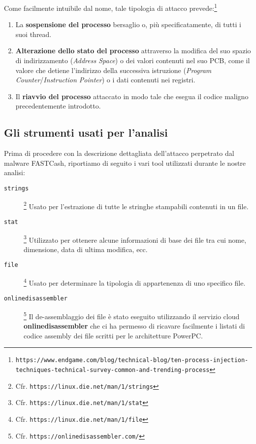 \documentclass[10pt,a4paper, titlepage]{report}
\begin{document}
Come facilmente intuibile dal nome, tale tipologia di attacco prevede:\footnote{\texttt{https://www.endgame.com/blog/technical-blog/ten-process-injection-techniques-technical-survey-common-and-trending-process}}
\begin{enumerate}
\item La \textbf{sospensione del processo} bersaglio o, più specificatamente, di tutti i suoi thread. 
\item \textbf{Alterazione dello stato del processo} attraverso la modifica del suo spazio di indirizzamento (\textit{Address Space}) o dei valori contenuti nel suo PCB, come il valore che detiene l'indirizzo della successiva istruzione (\textit{Program Counter}/\textit{Instruction Pointer}) o i dati contenuti nei registri.
\item Il \textbf{riavvio del processo} attaccato in modo tale che esegua il codice maligno precedentemente introdotto.
\end{enumerate}

\subsection{Gli strumenti usati per l'analisi}

Prima di procedere con la descrizione dettagliata dell'attacco perpetrato dal malware FASTCash, riportiamo di seguito i vari tool utilizzati durante le nostre analisi:

\begin{description}
\item[\texttt{strings}]\footnote{Cfr. \texttt{https://linux.die.net/man/1/strings}} Usato per l'estrazione di tutte le stringhe stampabili contenuti in un file.
\item[\texttt{stat}]\footnote{Cfr. \texttt{https://linux.die.net/man/1/stat}} Utilizzato per ottenere alcune informazioni di base dei file tra cui nome, dimensione, data di ultima modifica, ecc.
\item[\texttt{file}]\footnote{Cfr. \texttt{https://linux.die.net/man/1/file}} Usato per determinare la tipologia di appartenenza di uno specifico file.
\item[\texttt{onlinedisassembler}]\footnote{Cfr. \texttt{https://onlinedisassembler.com/}} Il de-assemblaggio dei file è stato eseguito utilizzando il servizio cloud \textbf{onlinedisassembler} che ci ha permesso di ricavare facilmente i listati di codice assembly dei file scritti per le architetture PowerPC\texttrademark.
\end{description}
\end{document}
